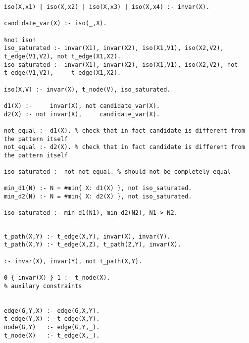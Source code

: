 \begin{lstlisting}[caption=Canonicity template-based check, style=model]
iso(X,x1) | iso(X,x2) | iso(X,x3) | iso(X,x4) :- invar(X).

candidate_var(X) :- iso(_,X).

%not iso!
iso_saturated :- invar(X1), invar(X2), iso(X1,V1), iso(X2,V2),     t_edge(V1,V2), not t_edge(X1,X2). 
iso_saturated :- invar(X1), invar(X2), iso(X1,V1), iso(X2,V2), not t_edge(V1,V2),     t_edge(X1,X2).

iso(X,V) :- invar(X), t_node(V), iso_saturated.

d1(X) :-     invar(X), not candidate_var(X). 
d2(X) :- not invar(X),     candidate_var(X).

not_equal :- d1(X). % check that in fact candidate is different from the pattern itself
not_equal :- d2(X). % check that in fact candidate is different from the pattern itself

iso_saturated :- not not_equal. % should not be completely equal

min_d1(N) :- N = #min{ X: d1(X) }, not iso_saturated.
min_d2(N) :- N = #min{ X: d2(X) }, not iso_saturated.

iso_saturated :- min_d1(N1), min_d2(N2), N1 > N2.
\end{lstlisting}

\begin{lstlisting}[caption=Auxilary predicates -- probably should be moved to appendix, style=model]
%selects subpattern

t_path(X,Y) :- t_edge(X,Y), invar(X), invar(Y).
t_path(X,Y) :- t_edge(X,Z), t_path(Z,Y), invar(X).

:- invar(X), invar(Y), not t_path(X,Y).

0 { invar(X) } 1 :- t_node(X).
% auxilary constraints


edge(G,Y,X) :- edge(G,X,Y).
t_edge(Y,X) :- t_edge(X,Y).
node(G,Y)   :- edge(G,Y,_).
t_node(X)   :- t_edge(X,_).
\end{lstlisting}

